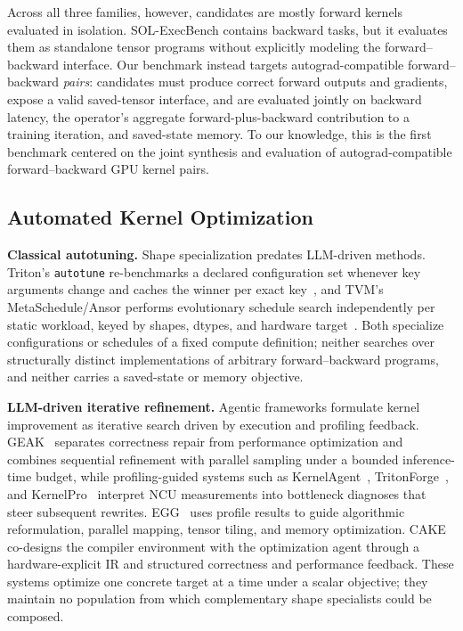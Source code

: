 Across all three families, however, candidates are mostly forward kernels evaluated in isolation. SOL-ExecBench contains backward tasks, but it evaluates them as standalone tensor programs without explicitly modeling the forward–backward interface. Our benchmark 
instead targets autograd-compatible forward--backward \emph{pairs}:
candidates must produce correct forward outputs and gradients, expose a valid
saved-tensor interface, and are evaluated jointly on backward latency, the
operator's aggregate forward-plus-backward contribution to a training
iteration, and saved-state memory. To our knowledge, this is the first
benchmark centered on the joint synthesis and evaluation of
autograd-compatible forward--backward GPU kernel pairs.

\subsection{Automated Kernel Optimization}

\noindent\textbf{Classical autotuning.}
Shape specialization predates LLM-driven methods. Triton's \texttt{autotune}
re-benchmarks a declared configuration set whenever key arguments change and
caches the winner per exact key~\cite{tillet2019triton}, and TVM's
MetaSchedule/Ansor performs evolutionary schedule search independently per
static workload, keyed by shapes, dtypes, and hardware
target~\cite{zheng2020ansor}. Both specialize configurations or schedules of
a fixed compute definition; neither searches over structurally distinct
implementations of arbitrary forward--backward programs, and neither carries
a saved-state or memory objective.

\noindent\textbf{LLM-driven iterative refinement.}
Agentic frameworks formulate kernel improvement as iterative search driven by
execution and profiling feedback. GEAK~\cite{wang2025geak} separates
correctness repair from performance optimization and combines sequential
refinement with parallel sampling under a bounded inference-time budget,
while profiling-guided systems such as KernelAgent~\cite{cheng2026kernelagent}, TritonForge~\cite{li2025tritonforge}, and
KernelPro~\cite{gai2026kernelpro} interpret NCU measurements into bottleneck diagnoses that steer subsequent rewrites. EGG~\cite{han2026egg} uses profile results to guide algorithmic reformulation, parallel mapping, tensor tiling, and memory optimization. CAKE~\cite{ye2026cake} co-designs the compiler environment with the optimization agent through a hardware-explicit IR and structured correctness and performance feedback. These systems optimize one concrete target at a time under a scalar objective;
they maintain no population from which complementary shape specialists could be composed.

